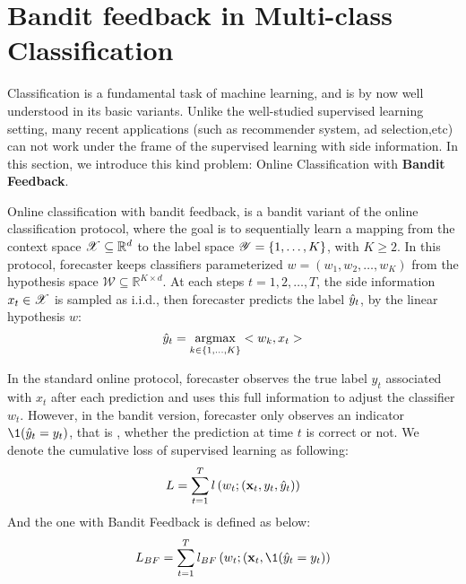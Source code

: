 \section{Bandit feedback in Multi-class Classification}
\label{sec:BF01}
Classification is a fundamental task of machine learning, and is by now well understood in its basic variants. Unlike the well-studied supervised learning setting, many recent applications (such as recommender system, ad selection,etc) can not work under the frame of  the supervised learning with side information. In this section, we introduce this kind problem: Online Classification with \textbf{Bandit Feedback}.

Online classification with bandit feedback, is a bandit variant of the online classification protocol, where the goal is to sequentially learn a mapping from the context space $\mathscr{X} \subseteq\mathbb{R}^d$ to the label space $\mathscr{Y}=\left\lbrace 1,\dots,K\right\rbrace$, with $K\geq 2$. In this protocol, forecaster keeps  classifiers parameterized $w=(w_1,w_2,\dots,w_K)$ from the hypothesis space $\mathscr{W} \subseteq \mathbb{R}^{K \times d} $. At each steps $t = 1,2,\dots,T$, the side information $x_t \in \mathscr{X}$ is sampled as i.i.d., then forecaster predicts the label $\hat{y}_t$, by the linear hypothesis $w$:
\begin{equation}
\label{equa:prediction}
\hat{y}_t = \underset{k\in\{1,\dots,K\}}{\text{argmax}} <w_k,x_t>
\end{equation}

In the standard online protocol, forecaster observes the true label $y_t$ associated with $x_t$ after each prediction and uses this full information to adjust the classifier $w_t$. However, in the bandit version, forecaster only observes an indicator $\1(\hy = y_t)$, that is , whether the prediction at time $t$ is correct or not. We denote the cumulative loss of supervised learning as following:
\begin{equation}
\label{equa:cumuloss}
L = \sum_{t=1}^T l \left(w_t; (\mathbf{x}_t,y_t,\hat{y}_t)\right)
\end{equation}
And the one with Bandit Feedback is defined as below:
\begin{equation}
\label{equa:cumulossBF}
L_{BF} = \sum_{t=1}^T l_{BF} \left(w_t; (\xt,\1(\hy=y_t)\right)
\end{equation}




